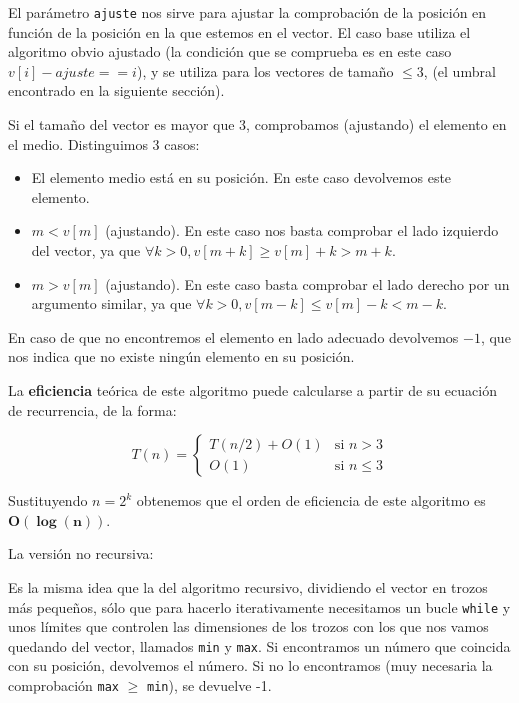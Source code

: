 El parámetro \texttt{ajuste} nos sirve para ajustar la comprobación de la posición en función de la posición en la que estemos en el vector.
El caso base utiliza el algoritmo obvio ajustado (la condición que se comprueba es en este caso $v[i]-ajuste == i$), y se utiliza para los vectores de tamaño $\leq 3$, (el umbral encontrado en la siguiente sección).

Si el tamaño del vector es mayor que 3, comprobamos (ajustando) el elemento en el medio.
Distinguimos 3 casos:

\begin{itemize}
  \item El elemento medio está en su posición. En este caso devolvemos este elemento.
  \item $m < v[m]$ (ajustando). En este caso nos basta comprobar el lado izquierdo del vector, ya que $\forall k > 0, v[m + k] \geq v[m] + k > m + k$.
  \item $m > v[m]$ (ajustando). En este caso basta comprobar el lado derecho por un argumento similar, ya que $\forall k > 0, v[m - k] \leq v[m] - k < m - k$.
\end{itemize}

En caso de que no encontremos el elemento en lado adecuado devolvemos $-1$, que nos indica que no existe ningún elemento en su posición.

La \textbf{eficiencia} teórica de este algoritmo puede calcularse a partir de su ecuación de recurrencia, de la forma:

\[
T(n) = \begin{cases} T(n/2) + O(1) & \mbox{si } n > 3 \\
O(1) & \mbox{si } n \leq 3 \end{cases}\]

Sustituyendo $n = 2^k$ obtenemos que el orden de eficiencia de este algoritmo es $\mathbf{O(\log(n))}$.

\vspace*{1cm}
\hrulefill
\vspace*{1cm}

La versión no recursiva:




Es la misma idea que la del algoritmo recursivo, dividiendo el vector en trozos más pequeños, sólo que para hacerlo iterativamente necesitamos un bucle \texttt{while} y unos límites que controlen las dimensiones de los trozos con los que nos vamos quedando del vector, llamados \texttt{min} y \texttt{max}.  Si encontramos un número que coincida con su posición, devolvemos el número. Si no lo encontramos (muy necesaria la comprobación \texttt{max} $\geq$ \texttt{min}), se devuelve -1.

